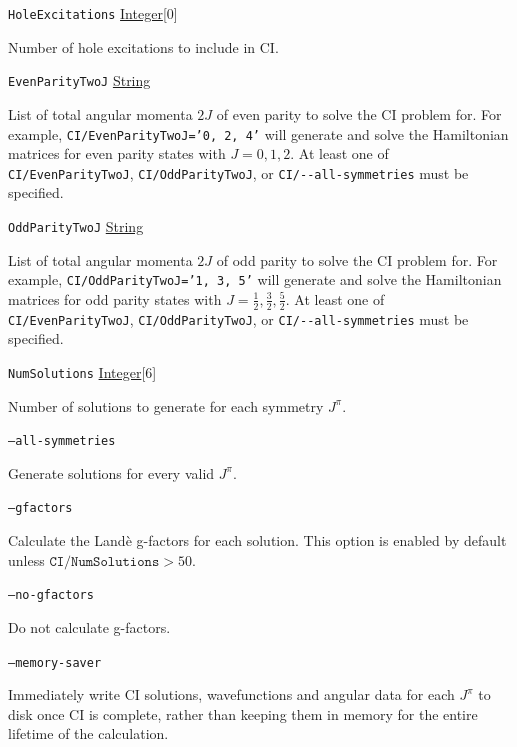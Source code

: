 \documentclass{report}
\begin{document}
\texttt{HoleExcitations} \uline{Integer}[0]
\begin{adjustwidth}{1cm}{}
Number of hole excitations to include in CI.
\end{adjustwidth}

\texttt{EvenParityTwoJ} \uline{String}
\begin{adjustwidth}{1cm}{}
List of total angular momenta $2J$ of even parity to solve the CI problem for.
For example, \texttt{CI/EvenParityTwoJ='0, 2, 4'} will generate and solve the Hamiltonian matrices for
even parity states with $J = 0, 1, 2$. At least one of \texttt{CI/EvenParityTwoJ}, 
\texttt{CI/OddParityTwoJ}, or \texttt{CI/{-}{-}all-symmetries} must be specified.
\end{adjustwidth}

\texttt{OddParityTwoJ} \uline{String}
\begin{adjustwidth}{1cm}{}
List of total angular momenta $2J$ of odd parity to solve the CI problem for.
For example, \texttt{CI/OddParityTwoJ='1, 3, 5'} will generate and solve the Hamiltonian matrices for
odd parity states with $J = \frac{1}{2}, \frac{3}{2}, \frac{5}{2}$. At least one of \texttt{CI/EvenParityTwoJ}, 
\texttt{CI/OddParityTwoJ}, or \texttt{CI/{-}{-}all-symmetries} must be specified.
\end{adjustwidth}

\texttt{NumSolutions} \uline{Integer}[6] 
\begin{adjustwidth}{1cm}{}
Number of solutions to generate for each symmetry $J^{\pi}$.
\end{adjustwidth}

\texttt{--all-symmetries} 
\begin{adjustwidth}{1cm}{}
Generate solutions for every valid $J^{\pi}$.
\end{adjustwidth}

\texttt{--gfactors} 
\begin{adjustwidth}{1cm}{}
Calculate the Land\`{e} g-factors for each solution. This option is enabled by default unless 
$\texttt{CI/NumSolutions} > 50$.
\end{adjustwidth}

\texttt{--no-gfactors} 
\begin{adjustwidth}{1cm}{}
Do not calculate g-factors.
\end{adjustwidth}

\texttt{--memory-saver}
\begin{adjustwidth}{1cm}{}
Immediately write CI solutions, wavefunctions and angular data for each $J^{\pi}$ to disk once CI is 
complete, rather than keeping them in memory for the entire lifetime of the calculation. 
\end{adjustwidth}
\end{document}
